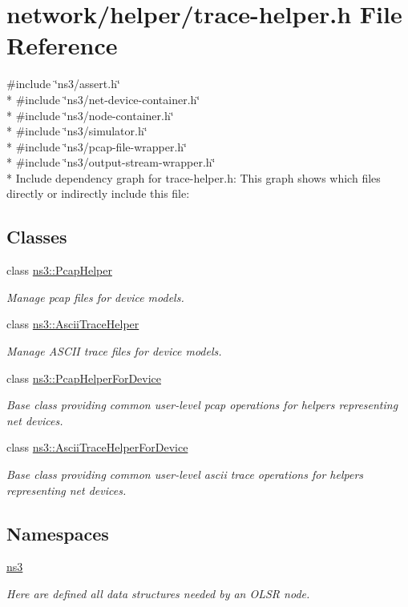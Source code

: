 \hypertarget{trace-helper_8h}{}\section{network/helper/trace-\/helper.h File Reference}
\label{trace-helper_8h}
{\ttfamily \#include \char`\"{}ns3/assert.\+h\char`\"{}}\\*
{\ttfamily \#include \char`\"{}ns3/net-\/device-\/container.\+h\char`\"{}}\\*
{\ttfamily \#include \char`\"{}ns3/node-\/container.\+h\char`\"{}}\\*
{\ttfamily \#include \char`\"{}ns3/simulator.\+h\char`\"{}}\\*
{\ttfamily \#include \char`\"{}ns3/pcap-\/file-\/wrapper.\+h\char`\"{}}\\*
{\ttfamily \#include \char`\"{}ns3/output-\/stream-\/wrapper.\+h\char`\"{}}\\*
Include dependency graph for trace-\/helper.h\+:
This graph shows which files directly or indirectly include this file\+:
\subsection*{Classes}
\begin{DoxyCompactItemize}
\item 
class \hyperlink{classns3_1_1PcapHelper}{ns3\+::\+Pcap\+Helper}
\begin{DoxyCompactList}\small\item\em Manage pcap files for device models. \end{DoxyCompactList}\item 
class \hyperlink{classns3_1_1AsciiTraceHelper}{ns3\+::\+Ascii\+Trace\+Helper}
\begin{DoxyCompactList}\small\item\em Manage A\+S\+C\+II trace files for device models. \end{DoxyCompactList}\item 
class \hyperlink{classns3_1_1PcapHelperForDevice}{ns3\+::\+Pcap\+Helper\+For\+Device}
\begin{DoxyCompactList}\small\item\em Base class providing common user-\/level pcap operations for helpers representing net devices. \end{DoxyCompactList}\item 
class \hyperlink{classns3_1_1AsciiTraceHelperForDevice}{ns3\+::\+Ascii\+Trace\+Helper\+For\+Device}
\begin{DoxyCompactList}\small\item\em Base class providing common user-\/level ascii trace operations for helpers representing net devices. \end{DoxyCompactList}\end{DoxyCompactItemize}
\subsection*{Namespaces}
\begin{DoxyCompactItemize}
\item 
 \hyperlink{namespacens3}{ns3}
\begin{DoxyCompactList}\small\item\em Here are defined all data structures needed by an O\+L\+SR node. \end{DoxyCompactList}\end{DoxyCompactItemize}
